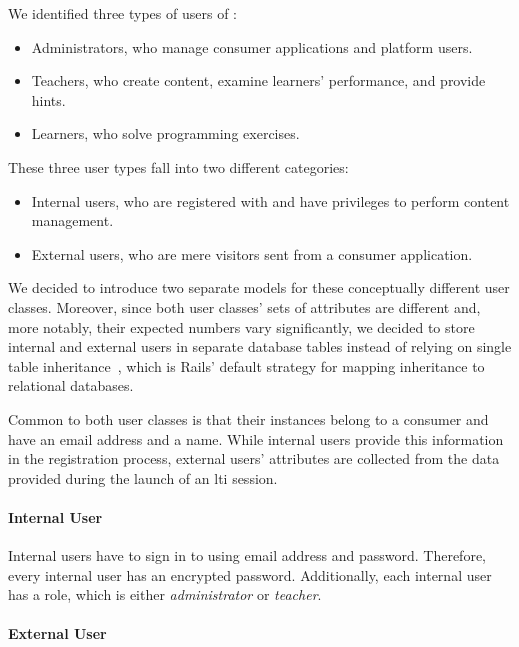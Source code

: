 We identified three types of users of \tool:

\begin{itemize}
\item
  Administrators, who manage consumer applications and platform users.
\item
  Teachers, who create content, examine learners' performance, and provide hints.
\item
  Learners, who solve programming exercises.
\end{itemize}

These three user types fall into two different categories:

\begin{itemize}
\item
  Internal users, who are registered with \tool and have privileges to perform content management.
\item
  External users, who are mere visitors sent from a consumer application.
\end{itemize}

We decided to introduce two separate models for these conceptually different user classes. Moreover, since both user classes' sets of attributes are different and, more notably, their expected numbers vary significantly, we decided to store internal and external users in separate database tables instead of relying on single table inheritance~\cite{ambler2000mapping}, which is Rails' default strategy for mapping inheritance to relational databases.

Common to both user classes is that their instances belong to a consumer and have an email address and a name. While internal users provide this information in the registration process, external users' attributes are collected from the data provided during the launch of an \gls{lti} session.

\paragraph{Internal User}

Internal users have to sign in to \tool using email address and password. Therefore, every internal user has an encrypted password. Additionally, each internal user has a role, which is either \emph{administrator} or \emph{teacher}.

\paragraph{External User}

